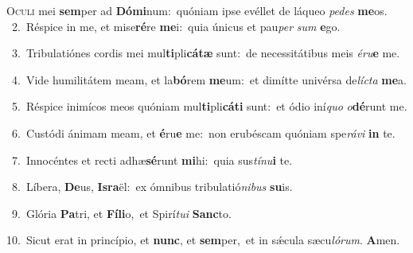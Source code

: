 \lettrine{\initial\textcolor{\initialcolor}{O}}{culi} mei \textbf{sem}\-per ad \textbf{Dó}\-\textbf{mi}num:~\star quóniam ipse evéllet de láqueo \textit{pe}\-\textit{des} \textbf{me}\-os.\\
{\numbfont\textcolor{\numbcolor}{~2.}}~Réspice in me, et mise\-\textbf{ré}\-re \textbf{me}\-i:~\star quia únicus et pau\textit{per} \textit{sum} \textbf{e}\-go.\par
{\numbfont\textcolor{\numbcolor}{~3.}}~Tribulatiónes cordis mei mul\-\textbf{ti}\-pli\-\textbf{cá}\-\textbf{tæ} sunt:~\star de necessitátibus meis \textit{é}\-\textit{ru}\textbf{e} me.\par
{\numbfont\textcolor{\numbcolor}{~4.}}~Vide humilitátem meam, et la\-\textbf{bó}\-rem \textbf{me}\-um:~\star et dimítte univérsa de\-\textit{líc}\-\textit{ta} \textbf{me}\-a.\par
{\numbfont\textcolor{\numbcolor}{~5.}}~Réspice inimícos meos quóniam mul\-\textbf{ti}\-pli\-\textbf{cá}\-\textbf{ti} sunt:~\star et ódio iní\textit{quo} \textit{o}\-\textbf{dé}runt me.\par
{\numbfont\textcolor{\numbcolor}{~6.}}~Custódi ánimam meam, et \textbf{é}\-ru\textbf{e} me:~\star non erubéscam quóniam spe\-\textit{rá}\-\textit{vi} \textbf{in} te.\par
{\numbfont\textcolor{\numbcolor}{~7.}}~Innocéntes et recti adhæ\-\textbf{sé}\-runt \textbf{mi}\-hi:~\star quia sus\-\textit{tí}\-\textit{nu}\textbf{i} te.\par
{\numbfont\textcolor{\numbcolor}{~8.}}~Líbera, \textbf{De}\-us, \textbf{Is}\-\textbf{ra}ël:~\star ex ómnibus tribulatió\-\textit{ni}\-\textit{bus} \textbf{su}\-is.\par
{\numbfont\textcolor{\numbcolor}{~9.}}~Glória \textbf{Pa}\-tri, et \textbf{Fí}\-\textbf{li}o,~\star et Spirí\-\textit{tu}\-\textit{i} \textbf{Sanc}\-to.\par
{\numbfont\textcolor{\numbcolor}{10.}}~Sicut erat in princípio, et \textbf{nunc}\-, et \textbf{sem}\-per,~\star et in sǽcula sæcu\-\textit{ló}\-\textit{rum}. \textbf{A}\-men.\par
